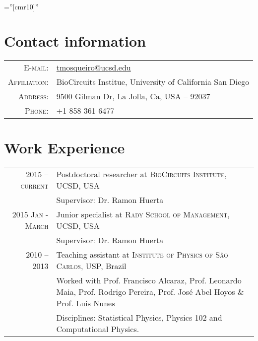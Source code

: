 \documentclass[a4paper,10pt]{article} %
\begin{document}
\pagestyle{empty} %

\font\fb=''[cmr10]'' %


\par{\bigskip\par} %

\section{Contact information}

\begin{tabular}{rl}
  \textsc{E-mail:} & \href{mailto:tmosqueiro@ucsd.edu}{tmosqueiro@ucsd.edu} \\
  \textsc{Affiliation:} & BioCircuits Institue, University of California San Diego \\
  \textsc{Address:} & 9500 Gilman Dr, La Jolla, Ca, USA -- 92037 \\
  \textsc{Phone:} & +1 858 361 6477\\
\end{tabular}


\section{Work Experience}

\begin{tabular}{r|p{11cm}}
  \setlength{\itemsep}{5cm}

  \textsc{2015 -- current} & Postdoctoral researcher at \textsc{BioCircuits Institute}, UCSD, USA \emph{}\\
  & \footnotesize{Supervisor: Dr. Ramon Huerta}

  \vspace{0.2cm}
  \\
  \textsc{2015 Jan - March} & Junior specialist at \textsc{Rady School of Management}, UCSD, USA \emph{}\\
  & \footnotesize{Supervisor: Dr. Ramon Huerta}

  \vspace{0.2cm}
  \\
  \textsc{2010 -- 2013} & Teaching assistant at \textsc{Institute of Physics of S\~ao Carlos}, USP, Brazil\\
  & \footnotesize{Worked with Prof. Francisco Alcaraz, Prof. Leonardo Maia, Prof. Rodrigo Pereira, Prof. Jos\'e Abel Hoyos \& Prof. Luis Nunes}\\
  & \footnotesize{Disciplines: Statistical Physics, Physics 102 and Computational Physics.}

\end{tabular}
\end{document}
